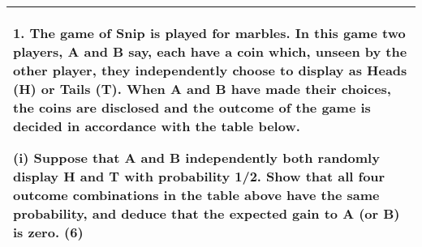 \documentclass[a4paper,12pt]{article}
\begin{document}
  \begin{table}[ht!]
  \centering
  \begin{tabular}{|p{15cm}|}
  \hline  
1. The game of Snip is played for marbles.  In this game two players, A and B say, each have a coin which, unseen by the other player, they independently choose to display as Heads (H) or Tails (T).  When A and B have made their choices, the coins are disclosed and the outcome of the game is decided in accordance with the table below.

 
(i) Suppose that A and B independently both randomly display H and T with probability 1/2.  Show that all four outcome combinations in the table above have the same probability, and deduce that the expected gain to A (or B) is zero. (6) 
\\ \hline
   \end{tabular}
 \end{table}
\end{document}
